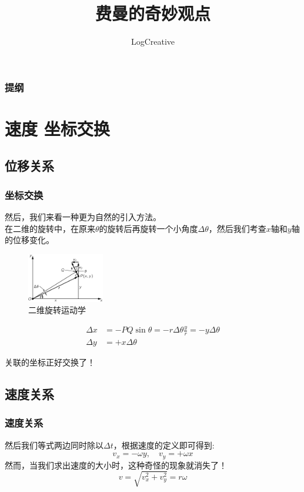 \documentclass{beamer}
\begin{document}
\begin{CJK}{UTF8}{hei}
    
    \title{费曼的奇妙观点}
    \author{LogCreative}

    \begin{frame}
    \titlepage
    \end{frame}

    \begin{frame}
    \frametitle{提纲}
    \tableofcontents
    \end{frame}

\section{速度 坐标交换}
\subsection[位移关系]{位移关系}
    \begin{frame}
        \frametitle{坐标交换}
        然后，我们来看一种更为自然的引入方法。\\
        在二维的旋转中，在原来$\theta$的旋转后再旋转一个小角度$\Delta\theta$，然后我们考查$x$轴和$y$轴的位移变化。
    \begin{figure}
    \centering
    \includegraphics[width=0.3\textwidth]{pic1.png}
    \caption{二维旋转运动学}
    \end{figure}
    \begin{align}
    \Delta x&=-PQ \sin\theta=-r\Delta\theta \frac{y}{r}=-y\Delta\theta \\
    \Delta y&=+x\Delta\theta
    \end{align}

    关联的坐标正好交换了！
    \end{frame}

\subsection{速度关系}
    \begin{frame}
    \frametitle{速度关系}
    然后我们等式两边同时除以$\Delta t$，根据速度的定义即可得到:
    \begin{equation}
        v_x=-\omega y,\quad  v_y=+\omega x
    \end{equation}
    然而，当我们求出速度的大小时，这种奇怪的现象就消失了！
    \begin{equation}
    v=\sqrt{v_x^2+v_y^2}=r\omega
    \end{equation}
    \end{frame}


\end{CJK}
\end{document}
